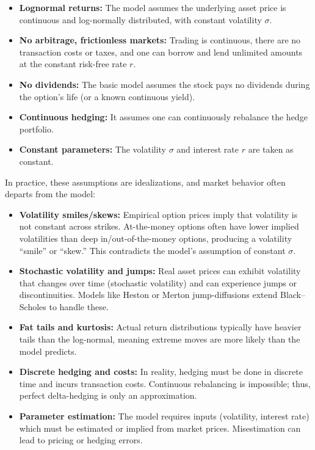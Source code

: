 \begin{itemize}
    \item \textbf{Lognormal returns:}  The model assumes the underlying asset price is continuous and log-normally distributed, with constant volatility \(\sigma\). 
    \item \textbf{No arbitrage, frictionless markets:}  Trading is continuous, there are no transaction costs or taxes, and one can borrow and lend unlimited amounts at the constant risk-free rate \(r\).
    \item \textbf{No dividends:}  The basic model assumes the stock pays no dividends during the option's life (or a known continuous yield).
    \item \textbf{Continuous hedging:}  It assumes one can continuously rebalance the hedge portfolio. 
    \item \textbf{Constant parameters:}  The volatility \(\sigma\) and interest rate \(r\) are taken as constant.
\end{itemize}

In practice, these assumptions are idealizations, and market behavior often departs from the model:

\begin{itemize}
    \item \textbf{Volatility smiles/skews:} Empirical option prices imply that volatility is not constant across strikes. At-the-money options often have lower implied volatilities than deep in/out-of-the-money options, producing a volatility ``smile'' or ``skew.'' This contradicts the model's assumption of constant \(\sigma\).
    \item \textbf{Stochastic volatility and jumps:}  Real asset prices can exhibit volatility that changes over time (stochastic volatility) and can experience jumps or discontinuities. Models like Heston or Merton jump-diffusions extend Black--Scholes to handle these.
    \item \textbf{Fat tails and kurtosis:}  Actual return distributions typically have heavier tails than the log-normal, meaning extreme moves are more likely than the model predicts.
    \item \textbf{Discrete hedging and costs:}  In reality, hedging must be done in discrete time and incurs transaction costs. Continuous rebalancing is impossible; thus, perfect delta-hedging is only an approximation.  
    \item \textbf{Parameter estimation:}  The model requires inputs (volatility, interest rate) which must be estimated or implied from market prices. Misestimation can lead to pricing or hedging errors.
\end{itemize}

